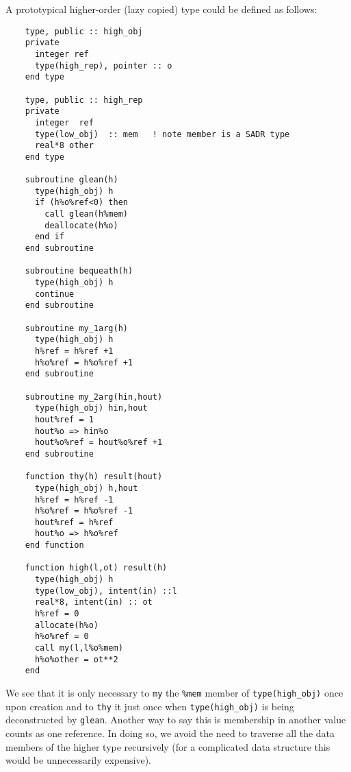 A prototypical higher-order (lazy copied) type could be defined as follows:
\begin{verbatim}
    type, public :: high_obj
    private
      integer ref
      type(high_rep), pointer :: o
    end type

    type, public :: high_rep
    private
      integer  ref
      type(low_obj)  :: mem   ! note member is a SADR type
      real*8 other
    end type

    subroutine glean(h)
      type(high_obj) h
      if (h%o%ref<0) then
        call glean(h%mem)
        deallocate(h%o)
      end if
    end subroutine

    subroutine bequeath(h)
      type(high_obj) h
      continue
    end subroutine

    subroutine my_1arg(h)
      type(high_obj) h
      h%ref = h%ref +1
      h%o%ref = h%o%ref +1
    end subroutine

    subroutine my_2arg(hin,hout)
      type(high_obj) hin,hout
      hout%ref = 1
      hout%o => hin%o
      hout%o%ref = hout%o%ref +1
    end subroutine

    function thy(h) result(hout)
      type(high_obj) h,hout
      h%ref = h%ref -1
      h%o%ref = h%o%ref -1
      hout%ref = h%ref
      hout%o => h%o%ref
    end function

    function high(l,ot) result(h)
      type(high_obj) h
      type(low_obj), intent(in) ::l
      real*8, intent(in) :: ot
      h%ref = 0
      allocate(h%o)
      h%o%ref = 0
      call my(l,l%o%mem)
      h%o%other = ot**2
    end
\end{verbatim}

We see that it is only necessary to \verb+my+ the \verb+%mem+
member of \verb+type(high_obj)+ once upon creation and to \verb+thy+
it just once when \verb+type(high_obj)+ is being deconstructed by
\verb+glean+.  Another way to say this is membership in another value
counts as one reference.  In doing so, we avoid the need to traverse
all the data members of the higher type recursively (for a complicated
data structure this would be unnecessarily expensive).

